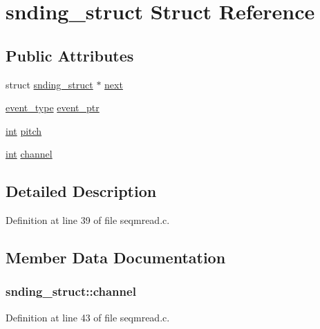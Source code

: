 \hypertarget{structsnding__struct}{}\section{snding\+\_\+struct Struct Reference}
\label{structsnding__struct}
\subsection*{Public Attributes}
\begin{DoxyCompactItemize}
\item 
struct \hyperlink{structsnding__struct}{snding\+\_\+struct} $\ast$ \hyperlink{structsnding__struct_aa6d1cd097acaaf897cc29a91ca7ed1f6}{next}
\item 
\hyperlink{seq_8h_af6509ba8f4584d40a046340b73d2bd15}{event\+\_\+type} \hyperlink{structsnding__struct_adbda1f2f4650fa868ded9b87274a318b}{event\+\_\+ptr}
\item 
\hyperlink{xmltok_8h_a5a0d4a5641ce434f1d23533f2b2e6653}{int} \hyperlink{structsnding__struct_ad79ba9d14950ea9fac3cd9e47f86ff7c}{pitch}
\item 
\hyperlink{xmltok_8h_a5a0d4a5641ce434f1d23533f2b2e6653}{int} \hyperlink{structsnding__struct_ab6ce3b82b04afa05ee99dcfbbd73ff05}{channel}
\end{DoxyCompactItemize}


\subsection{Detailed Description}


Definition at line 39 of file seqmread.\+c.



\subsection{Member Data Documentation}
\subsubsection[{\texorpdfstring{channel}{channel}}]{ snding\+\_\+struct\+::channel}\hypertarget{structsnding__struct_ab6ce3b82b04afa05ee99dcfbbd73ff05}{}\label{structsnding__struct_ab6ce3b82b04afa05ee99dcfbbd73ff05}


Definition at line 43 of file seqmread.\+c.

